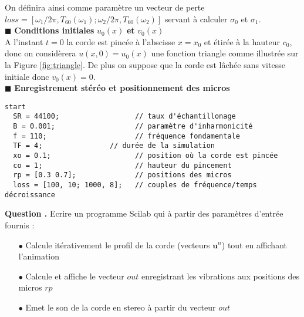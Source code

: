 \documentclass[a4,12pt]{article}
\newcommand{\ub}{\mathbf{u}}
\newcounter{Nbquestion}
\newcommand*\question{%
\stepcounter{Nbquestion}%
\textbf{Question \theNbquestion. }}
\begin{document}

  On définira ainsi comme paramètre un vecteur de perte $loss=[\omega_1/2\pi,T_{60}(\omega_1) ; \omega_2/2\pi,T_{60}(\omega_2)]$ servant à calculer $\sigma_0$ et $\sigma_1$. \\

  \hspace{0.5cm} $\blacksquare$ \textbf{Conditions initiales} $u_0(x)$ \textbf{et} $v_0(x)$\\

  A l'instant $t=0$ la corde est pincée à l'abscisse $x=x_0$ et étirée à la hauteur $c_0$, donc on considèrera $u(x,0)=u_0(x)$ une fonction triangle comme illustrée sur la Figure \ref{fig:triangle}. De plus on suppose que la corde est lâchée sans vitesse initiale donc $v_0(x)=0$.\\


  \hspace{0.5cm} $\blacksquare$ \textbf{Enregistrement stéréo et positionnement des micros}\\


  \begin{lstlisting}[frame=single,caption=Paramètres d'entrée]  
  start
  SR = 44100;                  // taux d'échantillonage 
  B = 0.001;                   // paramètre d'inharmonicité
  f = 110;                     // fréquence fondamentale
  TF = 4;			     // durée de la simulation
  xo = 0.1;                    // position où la corde est pincée
  co = 1;                      // hauteur du pincement
  rp = [0.3 0.7];              // positions des micros
  loss = [100, 10; 1000, 8];   // couples de fréquence/temps décroissance
  \end{lstlisting}


  \question Ecrire un programme Scilab qui à partir des paramètres d'entrée fournis : \\

  \begin{itemize}
    \item[$\bullet$] Calcule itérativement le profil de la corde (vecteurs $\ub^n$) tout en affichant l'animation\\
    \item[$\bullet$] Calcule et affiche le vecteur $out$ enregistrant les vibrations aux positions des micros $rp$\\ 	\item[$\bullet$] Emet le son de la corde en stereo à partir du vecteur $out$
  \end{itemize}
\end{document}
